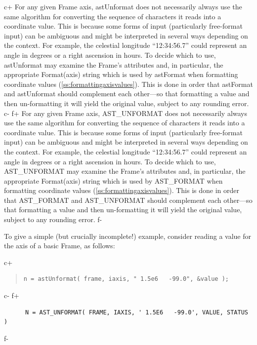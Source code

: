 \documentclass[twoside,11pt]{article}
\newcommand{\secref}[1]{\S\ref{#1}}
\renewcommand{\secref}[1]{\ref{#1}}
\begin{document}
c+
For any given Frame axis, astUnformat does not necessarily always use
the same algorithm for converting the sequence of characters it reads
into a coordinate value. This is because some forms of input
(particularly free-format input) can be ambiguous and might be
interpreted in several ways depending on the context. For example, the
celestial longitude ``12:34:56.7'' could represent an angle in degrees
or a right ascension in hours. To decide which to use, astUnformat may
examine the Frame's attributes and, in particular, the appropriate
Format(axis) string which is used by astFormat when formatting
coordinate values (\secref{ss:formattingaxisvalues}). This is done in
order that astFormat and astUnformat should complement each other---so
that formatting a value and then un-formatting it will yield the
original value, subject to any rounding error.
c-
f+
For any given Frame axis, AST\_UNFORMAT does not necessarily always
use the same algorithm for converting the sequence of characters it
reads into a coordinate value. This is because some forms of input
(particularly free-format input) can be ambiguous and might be
interpreted in several ways depending on the context. For example, the
celestial longitude ``12:34:56.7'' could represent an angle in degrees
or a right ascension in hours. To decide which to use, AST\_UNFORMAT
may examine the Frame's attributes and, in particular, the appropriate
Format(axis) string which is used by AST\_FORMAT when formatting
coordinate values (\secref{ss:formattingaxisvalues}). This is done in
order that AST\_FORMAT and AST\_UNFORMAT should complement each
other---so that formatting a value and then un-formatting it will
yield the original value, subject to any rounding error.
f-

To give a simple (but crucially incomplete!) example, consider reading
a value for the axis of a basic Frame, as follows:

c+
\begin{quote}
\small
\begin{verbatim}
n = astUnformat( frame, iaxis, " 1.5e6   -99.0", &value );
\end{verbatim}
\normalsize
\end{quote}
c-
f+
\small
\begin{verbatim}
      N = AST_UNFORMAT( FRAME, IAXIS, ' 1.5E6   -99.0', VALUE, STATUS )
\end{verbatim}
\normalsize
f-
\end{document}
